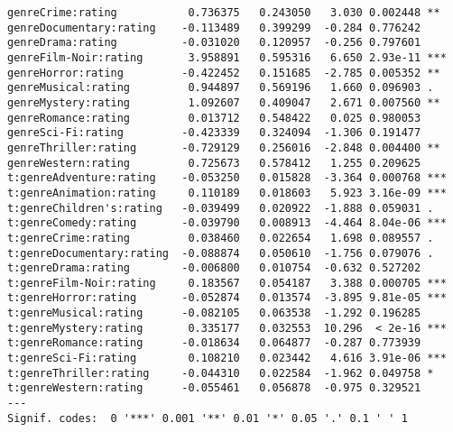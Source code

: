 \begin{verbatim}
genreCrime:rating           0.736375   0.243050   3.030 0.002448 **
genreDocumentary:rating    -0.113489   0.399299  -0.284 0.776242
genreDrama:rating          -0.031020   0.120957  -0.256 0.797601
genreFilm-Noir:rating       3.958891   0.595316   6.650 2.93e-11 ***
genreHorror:rating         -0.422452   0.151685  -2.785 0.005352 **
genreMusical:rating         0.944897   0.569196   1.660 0.096903 .
genreMystery:rating         1.092607   0.409047   2.671 0.007560 **
genreRomance:rating         0.013712   0.548422   0.025 0.980053
genreSci-Fi:rating         -0.423339   0.324094  -1.306 0.191477
genreThriller:rating       -0.729129   0.256016  -2.848 0.004400 **
genreWestern:rating         0.725673   0.578412   1.255 0.209625
t:genreAdventure:rating    -0.053250   0.015828  -3.364 0.000768 ***
t:genreAnimation:rating     0.110189   0.018603   5.923 3.16e-09 ***
t:genreChildren's:rating   -0.039499   0.020922  -1.888 0.059031 .
t:genreComedy:rating       -0.039790   0.008913  -4.464 8.04e-06 ***
t:genreCrime:rating         0.038460   0.022654   1.698 0.089557 .
t:genreDocumentary:rating  -0.088874   0.050610  -1.756 0.079076 .
t:genreDrama:rating        -0.006800   0.010754  -0.632 0.527202
t:genreFilm-Noir:rating     0.183567   0.054187   3.388 0.000705 ***
t:genreHorror:rating       -0.052874   0.013574  -3.895 9.81e-05 ***
t:genreMusical:rating      -0.082105   0.063538  -1.292 0.196285
t:genreMystery:rating       0.335177   0.032553  10.296  < 2e-16 ***
t:genreRomance:rating      -0.018634   0.064877  -0.287 0.773939
t:genreSci-Fi:rating        0.108210   0.023442   4.616 3.91e-06 ***
t:genreThriller:rating     -0.044310   0.022584  -1.962 0.049758 *
t:genreWestern:rating      -0.055461   0.056878  -0.975 0.329521
---
Signif. codes:  0 '***' 0.001 '**' 0.01 '*' 0.05 '.' 0.1 ' ' 1
\end{verbatim}

